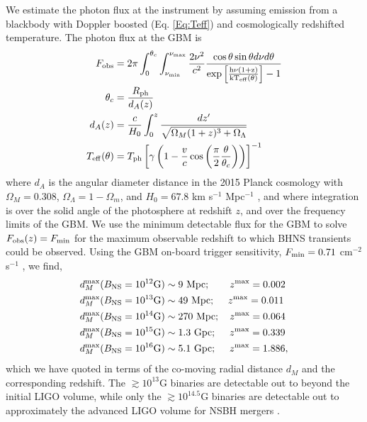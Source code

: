 We estimate the photon flux at the instrument by assuming emission
from a blackbody with Doppler boosted (Eq. \ref{Eq:Teff}) and
cosmologically redshifted temperature. The photon flux at the GBM is
\begin{align}
F_{\rm{obs}} &= 2 \pi \int^{\theta_c}_{0}\int^{\nu_{\rm{max}}}_{\nu_{\rm{min}}}{  \frac{2 \nu^2}{ c^2} \frac{\cos{\theta} \sin{\theta} d \nu d\theta}{\rm{exp\left[\frac{h \nu (1+z)}{ k T_{\rm{eff}}(\theta)}\right] - 1} }  }  \\ \nonumber
%
\theta_c &=\frac{R_{\rm{ph}}}{d_A(z)}  \\ \nonumber
%
d_A(z) &= \frac{c}{H_0} \int^z_0{\frac{dz'}{\sqrt{\Omega_M(1+z)^3 + \Omega_{\Lambda}}}}   \\ \nonumber
%
T_{\rm{eff}}(\theta)&= T_{\rm{ph}}\left[ \gamma \left( 1 - \frac{v}{c} \cos{\left( \frac{\pi}{2} \frac{\theta}{\theta_c}\right) } \right)\right]^{-1}
\end{align}
where $d_A$ is the angular diameter distance in the 2015 Planck
cosmology with $\Omega_M = 0.308$, $\Omega_{\Lambda} = 1-\Omega_m$,
and $H_0 = 67.8$ km s$^{-1}$ Mpc$^{-1}$
\citep{Planck:2015:CosmoParams}, and where integration is over the
solid angle of the photosphere at redshift $z$, and over the frequency
limits of the GBM. We use the minimum detectable flux for the GBM to
solve $F_{\rm{obs}}(z) = F_{\rm{min}}$ for the maximum observable
redshift to which BHNS transients could be observed. Using the GBM
on-board trigger sensitivity, $F_{\rm{min}} = 0.71$ cm$^{-2}$ s$^{-1}$
\citep{FERMIGBM:2015}, we find,
\begin{align}
d^{\rm max}_M (B_{\rm NS} = 10^{12} \mbox{G}) &\sim 9 \  \mbox{Mpc};  \ \ \ \quad z^{\rm{max}} = 0.002   \nonumber \\ 
d^{\rm max}_M (B_{\rm NS} = 10^{13} \mbox{G}) &\sim 49 \  \mbox{Mpc};  \ \quad z^{\rm{max}} = 0.011   \nonumber \\ 
d^{\rm max}_M (B_{\rm NS} = 10^{14} \mbox{G}) &\sim 270 \  \mbox{Mpc};  \quad z^{\rm{max}} = 0.064   \nonumber \\
d^{\rm max}_M (B_{\rm NS} = 10^{15} \mbox{G}) &\sim 1.3 \  \mbox{Gpc};  \ \quad z^{\rm{max}} = 0.339   \nonumber \\
d^{\rm max}_M (B_{\rm NS} = 10^{16} \mbox{G}) & \sim 5.1 \  \mbox{Gpc};  \ \quad z^{\rm{max}} = 1.886,
\end{align}
which we have quoted in terms of the co-moving radial distance $d_M$
and the corresponding redshift. The $\gtrsim 10^{13}$G binaries are
detectable out to beyond the initial LIGO volume, while only the
$\gtrsim 10^{14.5}$G binaries are detectable out to approximately the
advanced LIGO volume for NSBH mergers \citep[redshift
  $z\sim0.1$;][]{LIGORates:2010}.



